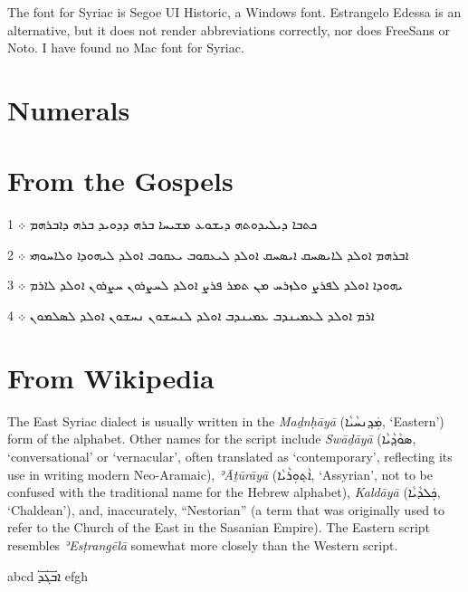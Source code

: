 \documentclass{article}
\begin{document}
The font for Syriac is Segoe UI Historic, a Windows font. Estrangelo
Edessa is an alternative, but it does not render abbreviations
correctly, nor does FreeSans or Noto. I have found no Mac font for
Syriac.

\section{Numerals}







\section{From the Gospels}


1 ܟܬܒܐ ܕܝܠܝܕܘܬܗ ܕܝܫܘܥ ܡܫܝܚܐ ܒܪܗ ܕܕܘܝܕ ܒܪܗ ܕܐܒܪܗܡ ܀

2 ܐܒܪܗܡ ܐܘܠܕ ܠܐܝܤܚܩ ܐܝܤܚܩ ܐܘܠܕ ܠܝܥܩܘܒ ܝܥܩܘܒ ܐܘܠܕ ܠܝܗܘܕܐ ܘܠܐܚܘܗܝ ܀

3 ܝܗܘܕܐ ܐܘܠܕ ܠܦܪܨ ܘܠܙܪܚ ܡܢ ܬܡܪ ܦܪܨ ܐܘܠܕ ܠܚܨܪܘܢ ܚܨܪܘܢ ܐܘܠܕ ܠܐܪܡ ܀

4 ܐܪܡ ܐܘܠܕ ܠܥܡܝܢܕܒ ܥܡܝܢܕܒ ܐܘܠܕ ܠܢܚܫܘܢ ܢܚܫܘܢ ܐܘܠܕ ܠܤܠܡܘܢ ܀


\section{From Wikipedia}

The East Syriac dialect is usually written in the \textit{Maḏnḥāyā}
(ܡܲܕ݂ܢܚܵܝܵܐ‎, ‘Eastern’) form of the alphabet. Other names for the
script include \textit{Swāḏāyā} (ܣܘܵܕ݂ܵܝܵܐ‎, ‘conversational’ or
‘vernacular’, often translated as ‘contemporary’, reflecting its use in
writing modern Neo-Aramaic), \textit{ʾĀṯūrāyā} (ܐܵܬ݂ܘܼܪܵܝܵܐ‎,
‘Assyrian’, not to be confused with the traditional name for the Hebrew
alphabet), \textit{Kaldāyā} (ܟܲܠܕܵܝܵܐ‎, ‘Chaldean’), and, inaccurately,
“Nestorian” (a term that was originally used to refer to the Church of
the East in the Sasanian Empire). The Eastern script resembles
\textit{ʾEsṭrangēlā} somewhat more closely than the Western script.

abcd ܐ܏ܒܓܕ efgh
\end{document}
